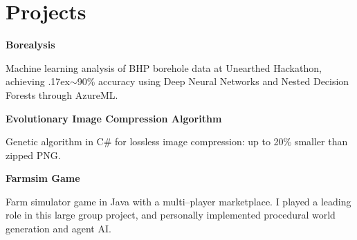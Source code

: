 \documentclass[a4paper]{article}
\renewenvironment{itemize}{
  \begin{list}{}{
    \setlength{\leftmargin}{1.5em}
  }
}{
  \end{list}
}
\newcommand{\dateitem}[1] {\item[\textbf{#1 :}]}
\renewcommand{\tilde} {{\raise.17ex\hbox{$\scriptstyle\mathtt{\sim}$}}}
\begin{document}
\section*{Projects}
\begin{itemize}
	
	\dateitem{2016} {\textbf{Borealysis}
		
		Machine learning analysis of BHP borehole data at Unearthed Hackathon, achieving \tilde{}90\% accuracy using Deep Neural Networks and Nested Decision Forests through AzureML.
	}


	
	\dateitem{2013} {\textbf{Evolutionary Image Compression Algorithm}
		
		Genetic algorithm in C\# for lossless image compression: up to 20\% smaller than zipped PNG.
	}
	\dateitem{2015 -- 2016} {\textbf{Farmsim Game}
		
		Farm simulator game in Java with a multi--player marketplace.
		I played a leading role in this large group project, and personally implemented procedural world generation and agent AI. 
	}
	
\end{itemize}

\bigskip

\end{document}
